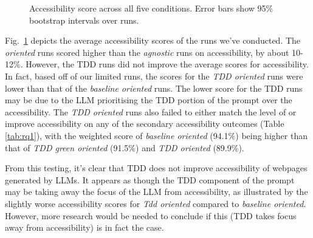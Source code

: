 \documentclass[conference]{IEEEtran}
\begin{document}
\begin{figure}[H]
  \centering
  \caption{Accessibility score across all five conditions. Error bars show 95\% bootstrap intervals over runs.}
  \label{fig:rq1-score}
\end{figure}

Fig.~\ref{fig:rq1-score} depicts the average accessibility scores of the runs we've conducted. The \textit{oriented} runs scored higher than the 
\textit{agnostic} runs on accessibility, by about 10-12\%. However, the TDD runs did not improve the average scores for accessibility. 
In fact, based off of our limited runs, the scores for the \textit{TDD oriented} runs were lower than that of the \textit{baseline oriented} 
runs. The lower score for the TDD runs may be due to the LLM prioritising the TDD portion of the prompt over the accessibility. The 
\textit{TDD oriented} runs also failed to either match the level of or improve accessibility on any of the secondary accessibility outcomes (Table \ref{tab:rq1}), with the 
weighted score of \textit{baseline oriented} (94.1\%) being higher than that of \textit{TDD green oriented} (91.5\%) and 
\textit{TDD oriented} (89.9\%). 

From this testing, it's clear that TDD does not improve accessibility of webpages generated by LLMs. It appears as though
the TDD component of the prompt may be taking away the focus of the LLM from accessibility, as illustrated by the slightly
worse accessibility scores for \textit{Tdd oriented} compared to \textit{baseline oriented}. However, more research would
be needed to conclude if this (TDD takes focus away from accessibility) is in fact the case. 
\end{document}
